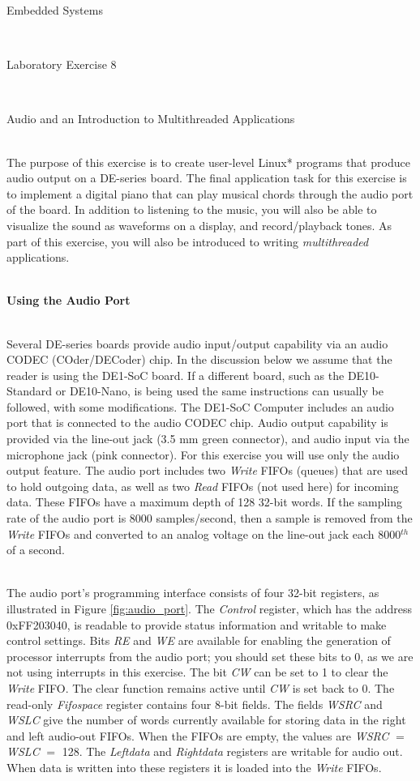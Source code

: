 \documentclass[epsfig,10pt,fullpage]{article}
\newcommand{\LabNum}{8}
\begin{document}
\centerline{\huge Embedded Systems}
~\\
\centerline{\huge Laboratory Exercise \LabNum}
~\\
\centerline{\large Audio and an Introduction to Multithreaded Applications}
~\\

\noindent
The purpose of this exercise is to create user-level Linux* programs that 
produce audio output on a DE-series board. The final application task for this exercise is
to implement a digital piano that can play musical chords through the audio port of the board.
In addition to listening to the music, you will also be able to visualize the sound as
waveforms on a display, and record/playback tones. As part of this exercise, you will also
be introduced to writing {\it multithreaded} applications.

~\\
\noindent
{\bf Using the Audio Port}

~\\
\noindent
Several DE-series boards provide audio input/output capability via an audio CODEC (COder/DECoder) 
chip. In the discussion below we assume that the reader is using the DE1-SoC board. If 
a different board, such as the DE10-Standard or DE10-Nano, is being used the same instructions 
can usually be followed, with some modifications.
The DE1-SoC Computer includes an audio port that is connected to the audio CODEC chip. 
Audio output capability is provided via the line-out jack (3.5 mm green connector), and 
audio input via the microphone jack (pink connector).
For this exercise you will use only the audio output feature. The audio port includes 
two {\it Write} FIFOs (queues) that are used to hold outgoing data, as well as two {\it Read}
FIFOs (not used here) for incoming data. These FIFOs have a maximum depth of 128 32-bit words.
If the sampling rate of the audio port is 8000 samples/second, then a sample is removed 
from the {\it Write} FIFOs and converted to an analog voltage on the line-out jack each 
8000$^{th}$ of a second.

~\\
\noindent
The audio port's programming interface consists of four 32-bit registers, as illustrated in 
Figure \ref{fig:audio_port}. The {\it Control} register, which has the address {\sf 0xFF203040},
is readable to provide status information and writable to make control settings. Bits {\it RE}
and {\it WE} are available for enabling the generation of processor interrupts from the
audio port; you should set these bits to 0, as we are not using interrupts in this exercise.
The bit {\it CW} can be set to 1 to clear the {\it Write} FIFO. The clear function remains
active until {\it CW} is set back to 0. The read-only {\it Fifospace} register contains four
8-bit fields. The fields {\it WSRC} and {\it WSLC} give the number of words currently available
for storing data in the right and left audio-out FIFOs. When the FIFOs are empty, the values
are {\it WSRC} $=$ {\it WSLC} $=$ 128. The {\it Leftdata} and {\it Rightdata} registers
are writable for audio out. When data is written into these registers it is loaded into the 
{\it Write} FIFOs.
\end{document}
